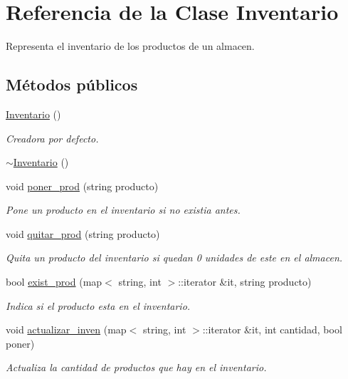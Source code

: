 \hypertarget{class_inventario}{}\section{Referencia de la Clase Inventario}
\label{class_inventario}


Representa el inventario de los productos de un almacen.  


\subsection*{Métodos públicos}
\begin{DoxyCompactItemize}
\item 
\hyperlink{class_inventario_ab7ca21da6822bc59fa236f7238e20fd3}{Inventario} ()
\begin{DoxyCompactList}\small\item\em Creadora por defecto. \end{DoxyCompactList}\item 
\hyperlink{class_inventario_a0b5c030c7cc22e57f92743fa26b781de}{$\sim$\+Inventario} ()
\item 
void \hyperlink{class_inventario_abe2124eed6c79aca488754a28142a3a6}{poner\+\_\+prod} (string producto)
\begin{DoxyCompactList}\small\item\em Pone un producto en el inventario si no existia antes. \end{DoxyCompactList}\item 
void \hyperlink{class_inventario_a7a9da8d5d032fc99b5a423209f871f8b}{quitar\+\_\+prod} (string producto)
\begin{DoxyCompactList}\small\item\em Quita un producto del inventario si quedan 0 unidades de este en el almacen. \end{DoxyCompactList}\item 
bool \hyperlink{class_inventario_a40f900ef1c0cdde02586ad56e06db58f}{exist\+\_\+prod} (map$<$ string, int $>$\+::iterator \&it, string producto)
\begin{DoxyCompactList}\small\item\em Indica si el producto esta en el inventario. \end{DoxyCompactList}\item 
void \hyperlink{class_inventario_ad11573bc6099edb9cf7bf63501b1a85f}{actualizar\+\_\+inven} (map$<$ string, int $>$\+::iterator \&it, int cantidad, bool poner)
\begin{DoxyCompactList}\small\item\em Actualiza la cantidad de productos que hay en el inventario. \end{DoxyCompactList}\item 

\end{DoxyCompactItemize}
